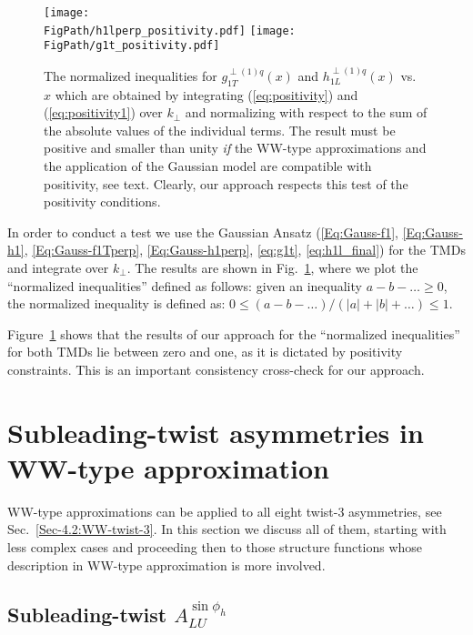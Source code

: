 \documentclass[a4paper,11pt]{article}
\def\kperp{k_\perp}
\newcommand*{\FigPath}{./figs}%
\begin{document}
\begin{figure}[b!]
\centering
\texttt{[image: \\FigPath/h1lperp\_positivity.pdf]} \quad
\texttt{[image: \\FigPath/g1t\_positivity.pdf]}
	\caption{\label{h1l_pos}
	The normalized inequalities for $g^{\perp(1)q}_{1T}(x)$ and
	$h^{\perp(1)q}_{1L}(x)$ vs.~$x$ which are obtained by integrating
	(\ref{eq:positivity}) and (\ref{eq:positivity1}) over $\kperp$
	and normalizing with respect to the sum of the absolute
	values of the individual terms. The result must be positive and
	smaller than unity {\it if} the WW-type approximations
	and the application of the Gaussian model are compatible
	with positivity, see text. Clearly, our approach respects
	this test of the positivity conditions.}
\end{figure}


In order to conduct a test we use the Gaussian Ansatz
(\ref{Eq:Gauss-f1}, \ref{Eq:Gauss-h1}, \ref{Eq:Gauss-f1Tperp},
\ref{Eq:Gauss-h1perp}, \ref{eq:g1t}, \ref{eq:h1l_final}) for the
TMDs and integrate over $k_\perp$. The results are shown in
Fig.~\ref{h1l_pos}, where we plot the ``normalized inequalities''
defined as follows:
given an inequality $a-b-\dots \ge 0$, the normalized inequality
is defined as: $0 \le (a-b-\dots)/(|a|+|b|+\dots) \le 1$.

Figure~\ref{h1l_pos} shows that the results of our approach for the
``normalized inequalities'' for both TMDs lie between
zero and one, as it is dictated by positivity constraints.
This is an important consistency cross-check for our approach.


\section{Subleading-twist asymmetries in WW-type approximation}
\label{Sec-7:twist-3-and-WW}

WW-type approximations can be applied to all eight twist-3 asymmetries,
see Sec.~\ref{Sec-4.2:WW-twist-3}. In this section we discuss all of them,
starting with less complex cases and proceeding then to those structure
functions whose description in WW-type approximation is more involved.

\subsection{\boldmath Subleading-twist  $A_{LU}^{\sin\phi_h}$}
\label{Sec-7.1:FLU}
\end{document}
